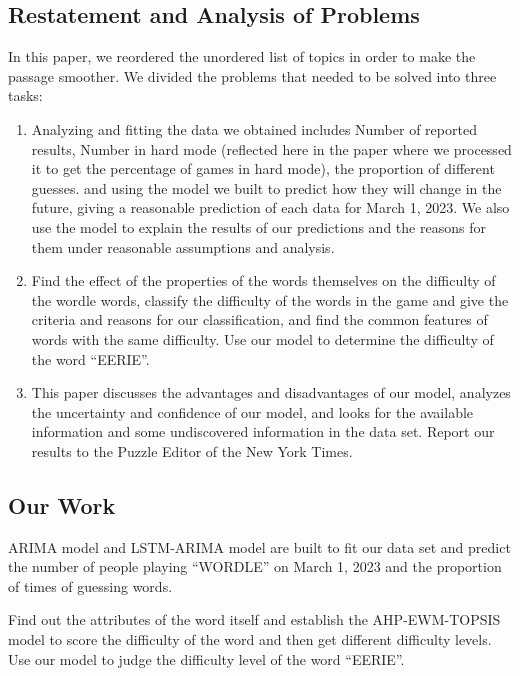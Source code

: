 \documentclass[12pt]{article}  %
\begin{document}
\subsection{Restatement and Analysis of Problems}
In this paper, we reordered the unordered list of topics in order to make the passage smoother. We divided the problems that needed to be solved into three tasks:
\begin{enumerate}
\renewcommand{\labelenumi}{{\sc Task} \theenumi}
\item Analyzing and fitting the data we obtained includes Number of reported results, Number in hard mode (reflected here in the paper where we processed it to get the percentage of games in hard mode), the proportion of different guesses. and using the model we built to predict how they will change in the future, giving a reasonable prediction of each data for March 1, 2023. We also use the model to explain the results of our predictions and the reasons for them under reasonable assumptions and analysis.
\item Find the effect of the properties of the words themselves on the difficulty of the wordle words, classify the difficulty of the words in the game and give the criteria and reasons for our classification, and find the common features of words with the same difficulty. Use our model to determine the difficulty of the word ``EERIE''.
\item This paper discusses the advantages and disadvantages of our model, analyzes the uncertainty and confidence of our model, and looks for the available information and some undiscovered information in the data set. Report our results to the Puzzle Editor of the New York Times.
\end{enumerate}
\subsection{Our Work}
{\LARGE\CheckedBox} ARIMA model and LSTM-ARIMA model are built to fit our data set and predict the number of people playing ``WORDLE'' on March 1, 2023 and the proportion of times of guessing words.

{\LARGE\CheckedBox} Find out the attributes of the word itself and establish the AHP-EWM-TOPSIS model to score the difficulty of the word and then get different difficulty levels. Use our model to judge the difficulty level of the word ``EERIE''.
\end{document}
